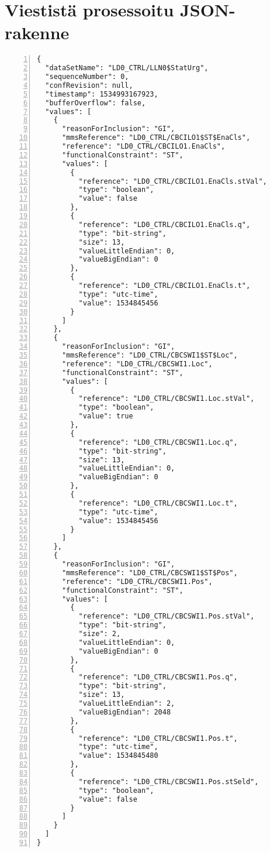 \chapter{Viestistä prosessoitu JSON-rakenne}
\label{ch:report-json-format}

\begin{lstlisting}[caption={Viestin prosessoitu JSON-rakenne.},label={lst:json-rakenne},numbers=left]
{
  "dataSetName": "LD0_CTRL/LLN0$StatUrg",
  "sequenceNumber": 0,
  "confRevision": null,
  "timestamp": 1534993167923,
  "bufferOverflow": false,
  "values": [
    {
      "reasonForInclusion": "GI",
      "mmsReference": "LD0_CTRL/CBCILO1$ST$EnaCls",
      "reference": "LD0_CTRL/CBCILO1.EnaCls",
      "functionalConstraint": "ST",
      "values": [
        {
          "reference": "LD0_CTRL/CBCILO1.EnaCls.stVal",
          "type": "boolean",
          "value": false
        },
        {
          "reference": "LD0_CTRL/CBCILO1.EnaCls.q",
          "type": "bit-string",
          "size": 13,
          "valueLittleEndian": 0,
          "valueBigEndian": 0
        },
        {
          "reference": "LD0_CTRL/CBCILO1.EnaCls.t",
          "type": "utc-time",
          "value": 1534845456
        }
      ]
    },
    {
      "reasonForInclusion": "GI",
      "mmsReference": "LD0_CTRL/CBCSWI1$ST$Loc",
      "reference": "LD0_CTRL/CBCSWI1.Loc",
      "functionalConstraint": "ST",
      "values": [
        {
          "reference": "LD0_CTRL/CBCSWI1.Loc.stVal",
          "type": "boolean",
          "value": true
        },
        {
          "reference": "LD0_CTRL/CBCSWI1.Loc.q",
          "type": "bit-string",
          "size": 13,
          "valueLittleEndian": 0,
          "valueBigEndian": 0
        },
        {
          "reference": "LD0_CTRL/CBCSWI1.Loc.t",
          "type": "utc-time",
          "value": 1534845456
        }
      ]
    },
    {
      "reasonForInclusion": "GI",
      "mmsReference": "LD0_CTRL/CBCSWI1$ST$Pos",
      "reference": "LD0_CTRL/CBCSWI1.Pos",
      "functionalConstraint": "ST",
      "values": [
        {
          "reference": "LD0_CTRL/CBCSWI1.Pos.stVal",
          "type": "bit-string",
          "size": 2,
          "valueLittleEndian": 0,
          "valueBigEndian": 0
        },
        {
          "reference": "LD0_CTRL/CBCSWI1.Pos.q",
          "type": "bit-string",
          "size": 13,
          "valueLittleEndian": 2,
          "valueBigEndian": 2048
        },
        {
          "reference": "LD0_CTRL/CBCSWI1.Pos.t",
          "type": "utc-time",
          "value": 1534845480
        },
        {
          "reference": "LD0_CTRL/CBCSWI1.Pos.stSeld",
          "type": "boolean",
          "value": false
        }
      ]
    }
  ]
}
\end{lstlisting}
